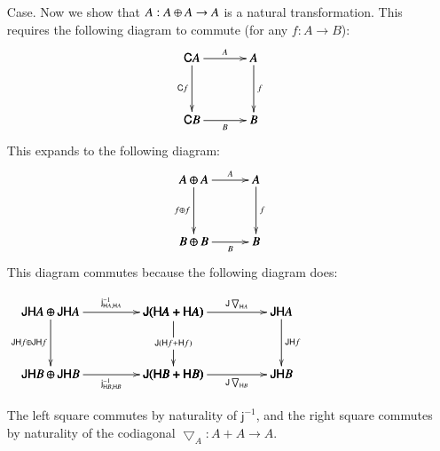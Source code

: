 \documentclass{lmcs}
\let\mto\to
\let\to\relax
\newcommand{\to}{\rightarrow}
\let\c\relax
\let\wn\relax
\newcommand{\func}[1]{\mathsf{#1}}
\newcommand{\c}[1]{\mathsf{c}_{#1}}
\newcommand{\jinv}[1]{\mathsf{j}^{-1}_{#1}}
\newcommand{\wn}[0]{\mathop{?}}
\newenvironment{diagram}{
  \begin{center}
    \begin{math}
      \bfig
}{
      \efig
    \end{math}
  \end{center}
}
\begin{document}
\begin{itemize}
\item[Case.] Now we show that $\c{A} : \wn A \oplus \wn A \mto \wn
  A$ is a natural transformation.  This requires the following
  diagram to commute (for any $f : A \mto B$):
  \[
  \bfig
  \square[
    \func{C}A`
    \wn A`
    \func{C}B`
    \wn B;
    \c{A}`
    \func{C}f`
    \wn f`
    \c{B}]
  \efig
  \]
  This expands to the following diagram:
  \[
  \bfig
  \square[
    \wn A \oplus \wn A`
    \wn A`
    \wn B \oplus \wn B`
    \wn B;
    \c{A}`
    \wn f \oplus \wn f`
    \wn f`
    \c{B}]
  \efig
  \]
  This diagram commutes because the following diagram does:
  \begin{diagram}
    \hSquares[
      \func{JH}A \oplus \func{JH}A`
      \func{J}(\func{H}A + \func{H}A)`
      \func{JH}A`
      \func{JH}B \oplus \func{JH}B`
      \func{J}(\func{H}B + \func{H}B)`
      \func{JH}B;
      \jinv{\func{H}A, \func{H}A}`
      \func{J}\bigtriangledown_{\func{H}A}`
      \func{JH}f \oplus \func{JH}f`
      \func{J}(\func{H}f + \func{H}f)`
      \func{JH}f`
      \jinv{\func{H}B, \func{H}B}`
      \func{J}\bigtriangledown_{\func{H}B}]
  \end{diagram}
  The left square commutes by naturality of $\jinv{}$, and the right square commutes by naturality of the codiagonal
  $\bigtriangledown_{A} : A + A \mto A$.


\end{itemize}
\end{document}

